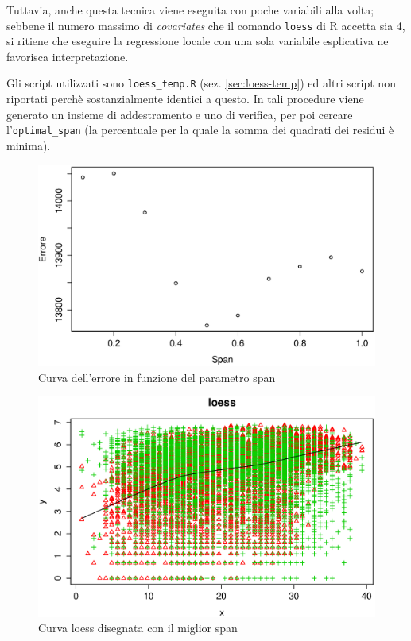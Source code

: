 Tuttavia, anche questa tecnica viene eseguita con poche variabili alla volta;
sebbene il numero massimo di \emph{covariates} che il comando \texttt{loess}
di R accetta sia 4, si ritiene che eseguire la regressione locale con una
sola variabile esplicativa ne favorisca interpretazione.

Gli script utilizzati sono \texttt{loess\_temp.R} (sez. \ref{sec:loess-temp})
ed altri script non riportati perchè sostanzialmente identici a questo. In
tali procedure viene generato un insieme di addestramento e uno di verifica,
per poi cercare l'\texttt{optimal\_span} (la percentuale per la quale la somma
dei quadrati dei residui è minima).

\begin{figure}[H]
  \centering
  \includegraphics[width=.7\columnwidth]{images/non-linear/loess-error-span.eps}
  \caption{Curva dell'errore in funzione del parametro span}
  \label{fig:loess-optimal-span}
\end{figure}

\begin{figure}[H]
  \centering
  \includegraphics[width=.7\columnwidth]{images/non-linear/loess-draw.eps}
  \caption{Curva loess disegnata con il miglior span}
  \label{fig:loess-draw}
\end{figure}


